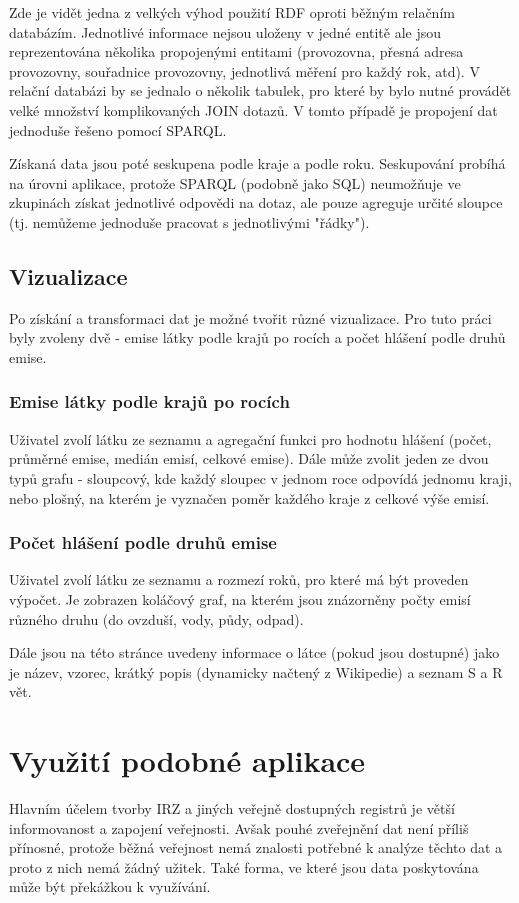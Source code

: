 \documentclass[12pt]{article}
\begin{document}
Zde je vidět jedna z velkých výhod použití RDF oproti běžným relačním databázím. Jednotlivé informace nejsou uloženy v jedné entitě ale jsou reprezentována několika propojenými entitami (provozovna, přesná adresa provozovny, souřadnice provozovny, jednotlivá měření pro každý rok, atd). V relační databázi by se jednalo o několik tabulek, pro které by bylo nutné provádět velké množství komplikovaných JOIN dotazů. V tomto případě je propojení dat jednoduše řešeno pomocí SPARQL.

Získaná data jsou poté seskupena podle kraje a podle roku. Seskupování probíhá na úrovni aplikace, protože SPARQL (podobně jako SQL) neumožňuje ve zkupinách získat jednotlivé odpovědi na dotaz, ale pouze agreguje určité sloupce (tj. nemůžeme jednoduše pracovat s jednotlivými "řádky").


\subsection*{Vizualizace}
Po získání a transformaci dat je možné tvořit různé vizualizace. Pro tuto práci byly zvoleny dvě - emise látky podle krajů po rocích a počet hlášení podle druhů emise.

\subsubsection*{Emise látky podle krajů po rocích}
Uživatel zvolí látku ze seznamu a agregační funkci pro hodnotu hlášení (počet, průměrné emise, medián emisí, celkové emise). Dále může zvolit jeden ze dvou typů grafu - sloupcový, kde každý sloupec v jednom roce odpovídá jednomu kraji, nebo plošný, na kterém je vyznačen poměr každého kraje z celkové výše emisí.

\subsubsection*{Počet hlášení podle druhů emise}
Uživatel zvolí látku ze seznamu a rozmezí roků, pro které má být proveden výpočet. Je zobrazen koláčový graf, na kterém jsou znázorněny počty emisí různého druhu (do ovzduší, vody, půdy, odpad).

Dále jsou na této stránce uvedeny informace o látce (pokud jsou dostupné) jako je název, vzorec, krátký popis (dynamicky načtený z Wikipedie) a seznam S a R vět.


\section*{Využití podobné aplikace}
Hlavním účelem tvorby IRZ a jiných veřejně dostupných registrů je větší informovanost a zapojení veřejnosti. Avšak pouhé zveřejnění dat není příliš přínosné, protože běžná veřejnost nemá znalosti potřebné k analýze těchto dat a proto z nich nemá žádný užitek. Také forma, ve které jsou data poskytována může být překážkou k využívání.
\end{document}
